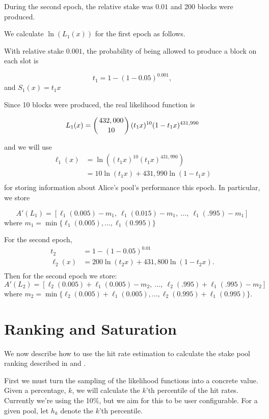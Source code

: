 \documentclass[11pt,a4paper,dvipsnames,twosided]{article}
\begin{document}
During the second epoch, the relative stake was $0.01$ and 200 blocks were produced.

We calculate $\ln(L_1(x))$ for the first epoch as follows.

With relative stake $0.001$, the probability of being allowed to produce a block on
each slot is

\[ t_1 = 1-(1-0.05)^{0.001}, \]
and $S_1(x)= t_1x$

Since 10 blocks were produced, the real likelihood function is

\[ L_1(x) =  \left( 432,000 \atop 10 \right) (t_1x)^{10} (1-t_1x)^{431,990} \]

and we will use
\[
\begin{array}{rl}
  \ell_1(x) &= \ln\left( (t_1x)^{10} (t_1x)^{431,990} \right) \\
            &= 10 \ln(t_1 x) + 431,990 \ln(1 - t_1 x) \\
\end{array}
\]
for storing information about Alice's pool's performance this epoch.
In particular, we store

\[ A'(L_1) = [\ell_1(0.005)-m_1,~\ell_1(0.015)-m_1,~\ldots,~\ell_1(.995)-m_1] \]
where $m_1=\min\{\ell_1(0.005),\ldots,\ell_1(0.995)\}$

For the second epoch,
\[
\begin{array}{rl}
  t_2 &= 1-(1-0.05)^{0.01} \\
  \ell_2(x) &= 200 \ln(t_2 x) + 431,800 \ln(1 - t_2 x).\\
\end{array}
\]
Then for the second epoch we store:
\[ A'(L_2) = [\ell_2(0.005)+\ell_1(0.005)-m_2,~\ldots,~\ell_2(.995)+\ell_1(.995)-m_2] \]
where $m_2=\min\{\ell_2(0.005)+\ell_1(0.005),\ldots,\ell_2(0.995)+\ell_1(0.995)\}$.

\section{Ranking and Saturation}

We now describe how to use the hit rate estimation to calculate the stake pool ranking
described in \cite{bkks2018} and \cite[Section 5.6]{delegation_design}.

First we must turn the sampling of the likelihood functions into a concrete value.
Given a percentage, $k$, we will calculate the $k$'th percentile of the hit rates.
Currently we're using the 10\%, but we aim for this to be user configurable.
For a given pool, let $h_k$ denote the $k$'th percentile.
\end{document}
